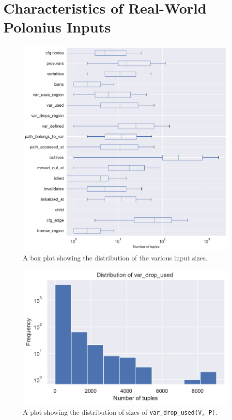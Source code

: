 \documentclass[11pt,a4paper,twoside,openany]{report}
\newcommand{\InDatalog}[1]{\texttt{#1}}
\begin{document}
\section{Characteristics of Real-World Polonius Inputs}\label{sec:inputs:inputs}

\begin{figure}
  \includegraphics[width=0.9\linewidth]{Graphs/input_sizes_boxplot.pdf}
  \caption[Distribution of Polonius Input Tuple Sizes]{A box plot showing the
    distribution of the various input sizes.}\label{fig:input-sizes}
\end{figure}

\begin{figure}
  \includegraphics[width=0.5\linewidth]{Graphs/var_drop_used_size_dist.pdf}
  \caption[Distribution of Input Sizes for the \InDatalog{var_drop_used(V, P)}
  Fact]{A plot showing the distribution of sizes of \InDatalog{var_drop_used(V,
      P)}.}\label{fig:input-var-drop-used}
\end{figure}
\end{document}
